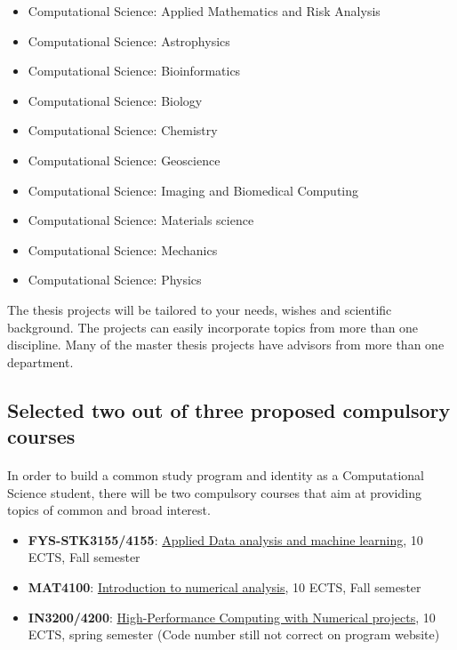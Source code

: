 \documentclass[%
oneside,                 %
final,                   %
10pt]{article}
\begin{document}
\begin{itemize}
\item Computational Science: Applied Mathematics and Risk Analysis

\item Computational Science: Astrophysics

\item Computational Science: Bioinformatics

\item Computational Science: Biology

\item Computational Science: Chemistry

\item Computational Science: Geoscience

\item Computational Science: Imaging and Biomedical Computing

\item Computational Science: Materials science

\item Computational Science: Mechanics

\item Computational Science: Physics
\end{itemize}

\noindent
The thesis projects will be tailored to your needs, wishes and scientific background. The projects can easily incorporate topics from more than one discipline. Many of the master thesis projects have advisors from more than one department.



\subsection*{Selected two out of three proposed compulsory courses}

\paragraph{}
In order to build a common study program and identity as a Computational Science student, there will be two compulsory courses that aim at providing topics of common and broad interest.

\begin{itemize}
\item \textbf{FYS-STK3155/4155}: \href{{https://www.uio.no/studier/emner/matnat/fys/FYS-STK4155/index-eng.html}}{Applied Data analysis and machine learning}, 10 ECTS, Fall semester

\item \textbf{MAT4100}: \href{{https://www.uio.no/studier/emner/matnat/math/MAT4110/index-eng.html}}{Introduction to numerical analysis}, 10 ECTS, Fall semester

\item \textbf{IN3200/4200}: \href{{https://www.uio.no/studier/emner/matnat/ifi/IN3200/index-eng.html}}{High-Performance Computing with Numerical projects}, 10 ECTS, spring semester (Code number still not correct on program website)
\end{itemize}
\end{document}
